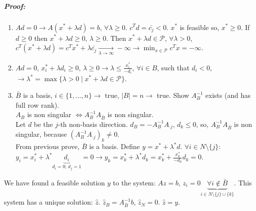 \documentclass[main]{subfiles}
\begin{document}
\subparagraph{Proof:}
\begin{enumerate}
\item $Ad =0 \rightarrow A(x^* + \lambda d) = b$, $\forall \lambda \geq 0$.
$c^T d = \bar{c_j} < 0$. $x^*$ is feasible so, $x^* \geq 0$. If $d \geq 0$
then $x^* + \lambda d \geq 0$, $\lambda \geq 0$. Then $x^* + \lambda d \in
\mathcal{P}$, $\forall \lambda > 0$, $c^T(x^* + \lambda d) = c^T x^* +
\lambda \bar{c_j} \xrightarrow[\lambda \to \infty]{} -\infty \rightarrow
\displaystyle \min_{x \in \mathcal{P}} c^{T} x = -\infty$.
\item $Ad = 0$, $x^*_i + \lambda d_i \geq 0$, $\lambda \geq 0 \rightarrow
\lambda \leq \frac{x^*_i}{-d_i}$, $\forall i \in B$, such that $d_i < 0$,
$\rightarrow \lambda^* = \max \{ \lambda > 0 \mid x^* + \lambda d
\in \mathcal{P} \}$.
\item $\bar{B}$ is a basis, $i \in \{1, \dots, n\} \rightarrow$ true,
$|B| = n \rightarrow$ true. Show $A^{-1}_B$ exists (and has full row rank).\\
\subitem $A_B$ is non singular $\iff A^{-1}_B A_{\bar{B}}$ is non singular.\\
Let $d$ be the $j$-th non-basis direction. $d_B = -A^{-1}_B A_{\cdot j}$,
$d_k \leq 0$, so, $A^{-1}_B A_{\bar{B}}$ is non singular, because
$(A^{-1}_B A_{\cdot j})_k \neq 0$.\\
\subitem From previous prove, $\bar{B}$ is a basis.
Define $y = x^* + \lambda^* d$. $\forall i \in N \setminus \{j\}$:
$y_i = x^*_i + \lambda^* \underbrace{d_i}_{d_i = 0 \text{; } d_j = 1} = 0
\rightarrow y_k = x^*_k + \lambda^* d_k = x^*_k + \frac{x^*_k}{-d_k} d_k = 0$.
\end{enumerate}

We have found a feasible solution $y$ to the system: $Az = b$, $z_i = 0
\underbrace{\forall i \notin \bar{B}}_{i \in N \setminus \{j\} \cup \{k\}}$.
This system has a unique solution: $\hat{z}$. $\hat{z}_B = A^{-1}_{\bar{B}} b$,
$\hat{z}_N = 0$. $\hat{z} = y$.
\end{document}
